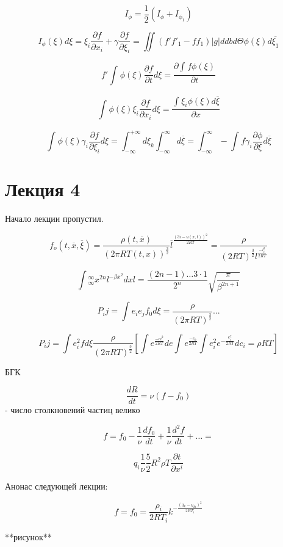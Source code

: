 \documentclass{article}
\begin{document}
\[ I_{\phi} = \frac{1}{2} (I_{\phi} + I_{{\phi}_1})\]

\[ I_{\phi}(\xi) d \xi =  \xi_i \frac{\partial f }{\partial x_i} + \gamma \frac{\partial f }{\partial \xi_i } = \iint (f' {f'}_1 - f f_1) |g| d db d \Theta \phi(\xi) d \overline{\xi_1} \]

\[ f'\int_{}^{} \phi(\xi) \frac{\partial f }{\partial t }d \xi = \frac{\partial \int_{}^{} f \phi (\xi) }{\partial t} \]

\[ \int_{}^{} \phi (\xi) \xi_i \frac{\partial f }{\partial x_i }d \xi = \frac{\int_{}^{} \xi_i \phi(\xi ) d \overline{\xi}}{\partial x} \]

\[ \int_{}^{} \phi (\xi) \gamma_i \frac{\partial f }{\partial \xi_i} d \xi = \int_{-\infty}^{+\infty} d \xi_k \int_{-\infty}^{\infty} d \overline{\xi} = \int_{-\infty}^{\infty}  -\int_{}^{} f \gamma_i \frac{\partial \phi}{\partial \xi } d \overline{\xi} \]

\section{Лекция 4}
Начало лекции пропустил. 

\[ f_o(t, \overline{x }, \overline{\xi}) = \frac{\rho (t, \overline{x})}{{(2 \pi R T(t, x))}^{\frac{3}{2}}} \overline{l}^{\frac{{(3i- u(x, t))}^2}{2RT}} = \frac{\rho }{ {(2 R T)}^{\frac{3}{2}} l^{\frac{-l^2_i}{2RT}}} \]

\[ \int{}_{\infty}^{\infty} x^{2n} l^{-\beta x^2} dxl = \frac{(2n-1) \dots 3 \cdot 1}{2^n} \sqrt{\frac{\pi }{\beta^{2n+1}}} \]

\[ P_ij = \int e_i e_j f_0 d\xi  = \frac{\rho}{{(2\pi R T)}^\frac{3}{2}} ... \]

\[ P_ij = \int e^2_i f d\xi  \frac{\rho}{(2\pi RT)^{\frac{3}{2}}} [ \int e^{\frac{-c i^2}{2 RT }} d e \int e^{\frac{-e_k}{2RT}} \int e^2_i e^{-\frac{e^2_i}{2RT}} dc_i = \rho RT] \]

БГК 

\[ \frac{dR}{dt} = \nu (f - f_0) \]  - число столкновений частиц велико

\[ f = f_0 - \frac{1}{\nu} \frac{df_0}{dt } + \frac{1}{\nu } \frac{d^2 f }{dt } + \dots =  \]

\[ q_i \frac{1}{\nu } \frac{5}{2} R^2 \rho T \frac{\partial t }{\partial x^i} \]

Анонас следующей лекции:

\[ f = f_0 = \frac{\rho_i}{{2RT_i}} k^{-\frac{{(3_k - u_{ki})}^2}{2RT_i}} \] 

**рисунок**
\end{document}
